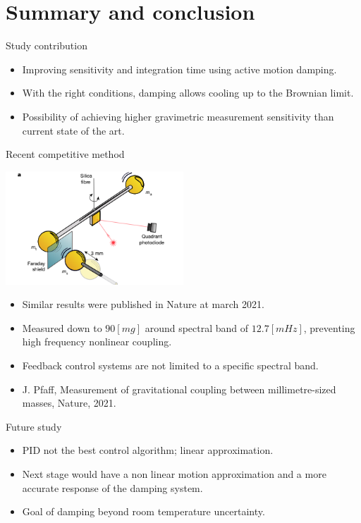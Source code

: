 \documentclass{beamer}
\begin{document}
\section{Summary and conclusion}


\begin{frame}{Study contribution}
	\begin{itemize}
		\item Improving sensitivity and integration time using active motion damping.
		\item With the right conditions, damping allows cooling up to the Brownian limit. 
		\item Possibility of achieving higher gravimetric measurement sensitivity than current state of the art.
		
	\end{itemize}
\end{frame}




\begin{frame}{Recent competitive method}
\begin{center}		
		\includegraphics[width=0.5\textwidth,keepaspectratio]{nature.PNG}
	\end{center}

	\begin{itemize}
		\item Similar results were published in Nature at march 2021.
		\item Measured down to $90 [mg]$ around spectral band of $12.7 [mHz]$, preventing high frequency nonlinear coupling.
		\item Feedback control systems are not limited to a specific spectral band.
		\fontsize{7}{11}\selectfont
		\item J. Pfaff, Measurement of gravitational coupling between millimetre-sized masses, Nature, 2021. 
		\normalsize

	\end{itemize}
\end{frame}

\begin{frame}{Future study}
	\begin{itemize}
		
		\item PID not the best control algorithm; linear approximation. 
		\item Next stage would have a non linear motion approximation and a more accurate response of the damping system.
		\item Goal of damping beyond room temperature uncertainty. 
	\end{itemize}
\end{frame}
\end{document}
